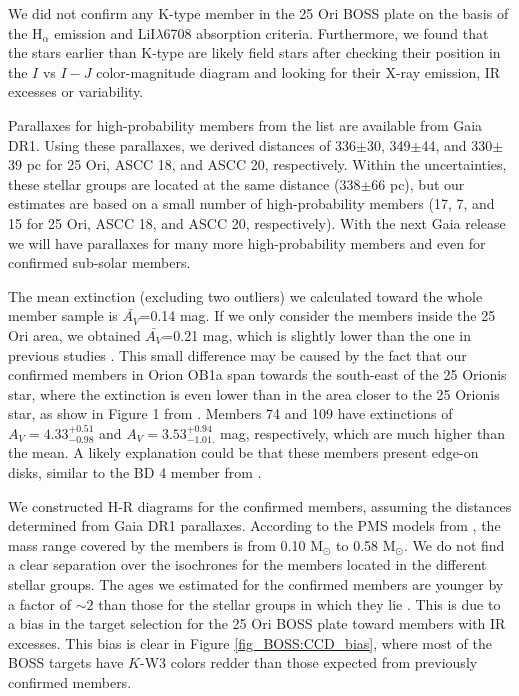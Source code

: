 \documentclass[12pt]{article}
\begin{document}
We did not confirm any K-type member in the 25 Ori BOSS plate on the basis of the H$_\alpha$ emission and LiI$\lambda$6708 absorption criteria. Furthermore, we found that the stars earlier than K-type are likely field stars after checking their position in the $I$ vs $I-J$ color-magnitude diagram and looking for their X-ray emission, IR excesses or variability.

Parallaxes for high-probability members from the \citet{Kharchenko2005} list are available from Gaia DR1. Using these parallaxes, we derived distances of 336$\pm$30, 349$\pm$44, and 330$\pm$39 pc for 25 Ori, ASCC 18, and ASCC 20, respectively. Within the uncertainties, these stellar groups are located at the same distance (338$\pm$66 pc), but our estimates are based on a small number of high-probability members (17, 7, and 15 for 25 Ori, ASCC 18, and ASCC 20, respectively). With the next Gaia release we will have parallaxes for many more high-probability members and even for confirmed sub-solar members. 

The mean extinction (excluding two outliers) we calculated toward the whole member sample is $\bar{A_V}$=0.14 mag. If we only consider the members inside the 25 Ori area, we obtained $\bar{A_V}$=0.21 mag, which is slightly lower than the one in previous studies \citep[0.27 mag, 0.28 mag, 0.29 mag, and 0.30 mag by ][]{Kharchenko2005, Briceno2005, Briceno2007, Downes2014}. This small difference may be caused by the fact that our confirmed members in Orion OB1a span towards the south-east of the 25 Orionis star, where the \citet{Schlegel1998} extinction is even lower than in the area closer to the 25 Orionis star, as show in Figure 1 from \citet{Downes2014}. Members 74 and 109 have extinctions of $A_V=4.33^{+0.51}_{-0.98}$ and $A_V=3.53^{+0.94}_{-1.01.}$ mag, respectively, which are much higher than the mean. A likely explanation could be that these members present edge-on disks, similar to the BD 4 member from \citet{Downes2015}.

We constructed H-R diagrams for the confirmed members, assuming the distances determined from Gaia DR1 parallaxes. According to the PMS models from \citet{Baraffe2015}, the mass range covered by the members is from 0.10 M$_\odot$ to 0.58 M$_\odot$. We do not find a clear separation over the isochrones for the members located in the different stellar groups. The ages we estimated for the confirmed members are younger by a factor of $\sim 2$ than those for the stellar groups in which they lie \citep{Kharchenko2005,Briceno2005,Briceno2007,Kharchenko2013,Downes2014}. This is due to a bias in the target selection for the 25 Ori BOSS plate toward members with IR excesses. This bias is clear in Figure \ref{fig_BOSS:CCD_bias}, where most of the BOSS targets have $K$-W3 colors redder than those expected from previously confirmed members. 
\end{document}
